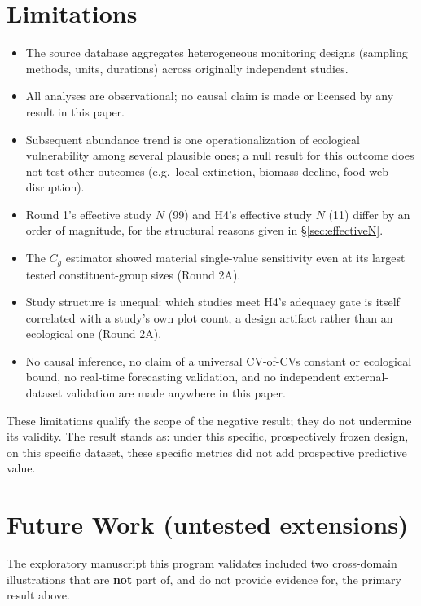 \documentclass[11pt]{article}
\newcommand{\Cg}{C_g}
\begin{document}
\section{Limitations}

\begin{itemize}
\item The source database aggregates heterogeneous monitoring designs
(sampling methods, units, durations) across originally independent
studies.
\item All analyses are observational; no causal claim is made or
licensed by any result in this paper.
\item Subsequent abundance trend is one operationalization of ecological
vulnerability among several plausible ones; a null result for this
outcome does not test other outcomes (e.g.\ local extinction, biomass
decline, food-web disruption).
\item Round 1's effective study $N$ (99) and H4's effective study $N$
(11) differ by an order of magnitude, for the structural reasons given in
\S\ref{sec:effectiveN}.
\item The $\Cg$ estimator showed material single-value sensitivity even
at its largest tested constituent-group sizes (Round 2A).
\item Study structure is unequal: which studies meet H4's adequacy gate
is itself correlated with a study's own plot count, a design artifact
rather than an ecological one (Round 2A).
\item No causal inference, no claim of a universal CV-of-CVs constant or
ecological bound, no real-time forecasting validation, and no
independent external-dataset validation are made anywhere in this paper.
\end{itemize}

These limitations qualify the scope of the negative result; they do not
undermine its validity. The result stands as: under this specific,
prospectively frozen design, on this specific dataset, these specific
metrics did not add prospective predictive value.

\section{Future Work (untested extensions)}

The exploratory manuscript this program validates included two
cross-domain illustrations that are \textbf{not} part of, and do not
provide evidence for, the primary result above.
\end{document}
